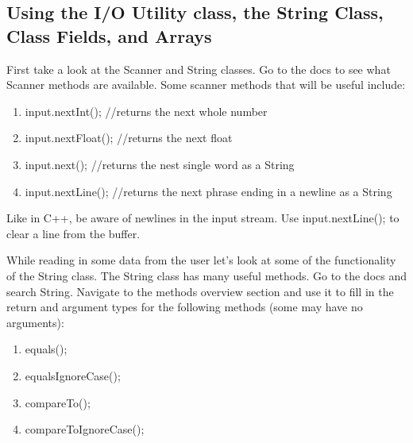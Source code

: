 \documentclass{article}
\begin{document}
\subsection{Using the I/O Utility class, the String Class, Class Fields, and Arrays}
\begin{steps}
      \item First take a look at the Scanner and String classes. 
         Go to the docs to see what Scanner methods are available.
         Some scanner methods that will be useful include: 
   \begin{enumerate}[label=\Alph*.]
      \item input.nextInt();     //returns the next whole number
      \item input.nextFloat();   //returns the next float
      \item input.next();        //returns the nest single word as a String
      \item input.nextLine();    //returns the next phrase ending in a newline as a String
   \end{enumerate}
      \item Like in C++, be aware of newlines in the input stream.
         Use input.nextLine(); to clear a line from the buffer.
      \item While reading in some data from the user let's look at some of the functionality of
         the String class. The String class has many useful methods. Go to the docs and search
         String. Navigate to the methods overview section and use it to fill in the return and
         argument types for the following methods (some may have no arguments):
   \begin{enumerate}[label=\Alph*.]
      \item \vspace{.5cm}\underline{\hspace{4cm}}equals(\underline{\hspace{4cm}});
      \item \vspace{.5cm}\underline{\hspace{4cm}}equalsIgnoreCase(\underline{\hspace{4cm}});
      \item \vspace{.5cm}\underline{\hspace{4cm}}compareTo(\underline{\hspace{4cm}});
      \item \vspace{.5cm}\underline{\hspace{4cm}}compareToIgnoreCase(\underline{\hspace{4cm}});

\end{enumerate}
\end{steps}
\end{document}
